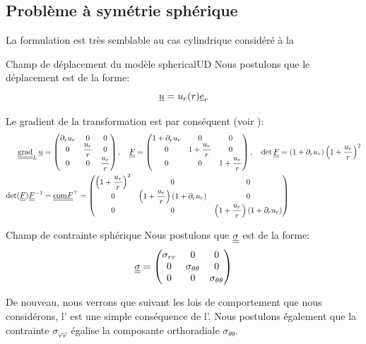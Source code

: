 \documentclass[10pt]{book}
\begin{document}
\subsection{Problème à symétrie sphérique}\label{Subsection:SphériqueUD}
La formulation est très semblable au cas cylindrique considéré à la 
\begin{Hypothese}{Champ de déplacement du modèle sphericalUD}\label{Hyp:Forme_champ_dep_sph1D} Nous postulons que le déplacement est de la forme:
$$\underline{u}=u_{r}(r)\underline{e}_{r}$$
\end{Hypothese}
Le gradient de la transformation est par conséquent (voir ):
$$\begin{aligned}
\tgrad_{L}\Dep&=\begin{pmatrix}
\partial_{r}u_{r} & 0 & 0\\
0 & \dfrac{u_{r}}{r} & 0\\
0 & 0 & \dfrac{u_{r}}{r}
\end{pmatrix}, \quad \GT = \begin{pmatrix}
1+\partial_{r}u_{r} & 0 & 0\\
0 & 1+\dfrac{u_{r}}{r} & 0\\
0 & 0 & 1+\dfrac{u_{r}}{r}
\end{pmatrix}, \quad \det\GT=\left(1+\partial_{r}u_{r} \right)\left(1+\dfrac{u_{r}}{r}\right)^{2}\\
\det(\GT)\GT^{-1}&=\ten{\mathrm{com}}\GT^{\top}=\begin{pmatrix}
\left(1+\dfrac{u_{r}}{r}\right)^{2} & 0 & 0\\
0 & \left(1+\dfrac{u_{r}}{r}\right)\left(1+\partial_{r}u_{r}\right) & 0\\
0 & 0 & \left(1+\dfrac{u_{r}}{r}\right)\left(1+\partial_{r}u_{r}\right)
\end{pmatrix}
\end{aligned}$$
\begin{Hypothese}{Champ de contrainte sphérique}\label{Hyp:Forme_champ_contraintes_sph1D} Nous postulons que $\underline{\underline{\sigma}}$ est de la forme:
$$\underline{\underline{\sigma}} = \begin{pmatrix}
\sigma_{rr} & 0 & 0\\
0 & \sigma_{\theta\theta} & 0\\
0 & 0 & \sigma_{\theta\theta}
\end{pmatrix}$$
\end{Hypothese}
De nouveau, nous verrons que suivant les lois de comportement que nous considérons, l' est une simple conséquence de l'. Nous postulons également que la contrainte $\sigma_{\varphi\varphi}$ égalise la composante orthoradiale $\sigma_{\theta\theta}$.\\
\end{document}

